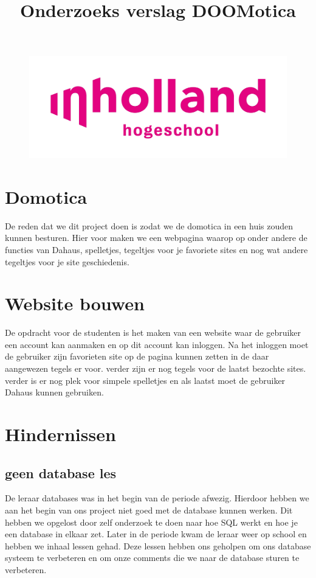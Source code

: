 \documentclass[11pt]{article}
\title{Onderzoeks verslag DOOMotica}
\begin{document}
	\maketitle %
	\begin{figure}[h]
		\centering
		\includegraphics[width=\textwidth]{inholland}
	\end{figure}
	
	\newpage
	
	\tableofcontents
	\newpage
	\section{Domotica}
	De reden dat we dit project doen is zodat we de domotica in een huis zouden kunnen besturen. Hier voor maken we een webpagina waarop op onder andere de functies van Dahaus, spelletjes, tegeltjes voor je favoriete sites en nog wat andere tegeltjes voor je site geschiedenis.
	\newline
	\newline
	\newline
	\newline
	\section{Website bouwen}
	
	De opdracht voor de studenten is het maken van een website waar de gebruiker een account kan aanmaken en op dit account kan inloggen. Na het inloggen moet de gebruiker zijn favorieten site op de pagina kunnen zetten in de daar aangewezen tegels er voor. verder zijn er nog tegels voor de laatst bezochte sites. verder is er nog plek voor simpele spelletjes en als laatst moet de gebruiker Dahaus kunnen gebruiken.
	\newpage
	
	\section{Hindernissen}
	
	\subsection{geen database les}
	De leraar databases was in het begin van de periode afwezig. Hierdoor hebben we aan het begin van ons project niet goed met de database kunnen werken. Dit hebben we opgelost door zelf onderzoek te doen naar hoe SQL werkt en hoe je een database in elkaar zet. Later in de periode kwam de leraar weer op school en hebben we inhaal lessen gehad. Deze lessen hebben ons geholpen om ons database systeem te verbeteren en om onze comments die we naar de database sturen te verbeteren.
	
\end{document}
